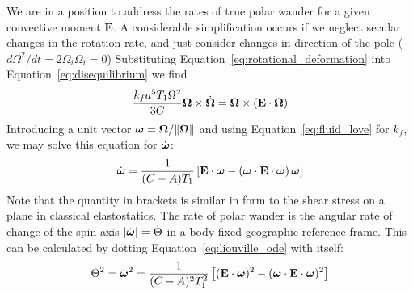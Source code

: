 \documentclass[extra,mreferee]{gji}
\begin{document}
We are in a position to address the rates of true polar wander for a given convective moment $\mathbf{E}$.
A considerable simplification occurs if we neglect secular changes in the rotation rate, and just consider changes in direction of the pole ($d \Omega^2 / dt = 2 {\Omega_i} \dot{ \Omega}_i = 0$)
Substituting Equation~\eqref{eq:rotational_deformation} into Equation~\eqref{eq:disequilibrium} we find
\begin{equation}
\frac{k_f a^5 T_1 \Omega^2}{3G}\mitbf{\Omega} \times \dot{\mitbf{\Omega} } = \mitbf{\Omega} \times \left( \mathbf{E} \cdot \mitbf{\Omega} \right)
\label{eq:liouville}
\end{equation}
Introducing a unit vector $\mitbf{\omega} = \mitbf{\Omega}/\|\mitbf{\Omega} \|$ and using Equation~\eqref{eq:fluid_love} for $k_f$,  we may solve this equation for $\dot{\mitbf{\omega}}$:
\begin{equation}
 \dot{\mitbf{\omega}}  = \frac{1}{(C-A)T_1} \left[ \mathbf{E} \cdot \mitbf{\omega} - \left( \mitbf{\omega} \cdot \mathbf{E} \cdot \mitbf{\omega}  \right) \mitbf{\omega} \right]
\label{eq:liouville_ode}
\end{equation}
Note that the quantity in brackets is similar in form to the shear stress on a plane in classical elastostatics.
The rate of polar wander is the angular rate of change of the spin axis $\left| \dot{\mitbf{\omega}} \right| = \dot{\Theta}$ in a body-fixed geographic reference frame.
This can be calculated by dotting Equation~\eqref{eq:liouville_ode} with itself:
\begin{equation}
\dot{\Theta}^2 = \dot{\mitbf{\omega}}^2 = \frac{1}{(C-A)^2 T_1^2} \left[ (\mathbf{E}\cdot\mitbf{\omega})^2 - (\mitbf{\omega}\cdot\mathbf{E}\cdot\mitbf{\omega})^2 \right]
\label{eq:polar_wander_rate_tensor}
\end{equation}
\end{document}

